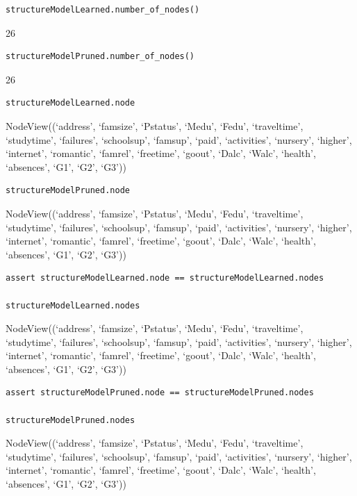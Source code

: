 \documentclass[
]{article}
\begin{document}
\begin{verbatim}
structureModelLearned.number_of_nodes()
\end{verbatim}

26

\begin{verbatim}
structureModelPruned.number_of_nodes()
\end{verbatim}

26

\begin{verbatim}
structureModelLearned.node
\end{verbatim}

NodeView((`address', `famsize', `Pstatus', `Medu', `Fedu', `traveltime',
`studytime', `failures', `schoolsup', `famsup', `paid', `activities',
`nursery', `higher', `internet', `romantic', `famrel', `freetime',
`goout', `Dalc', `Walc', `health', `absences', `G1', `G2', `G3'))

\begin{verbatim}
structureModelPruned.node
\end{verbatim}

NodeView((`address', `famsize', `Pstatus', `Medu', `Fedu', `traveltime',
`studytime', `failures', `schoolsup', `famsup', `paid', `activities',
`nursery', `higher', `internet', `romantic', `famrel', `freetime',
`goout', `Dalc', `Walc', `health', `absences', `G1', `G2', `G3'))

\begin{verbatim}
assert structureModelLearned.node == structureModelLearned.nodes

structureModelLearned.nodes
\end{verbatim}

NodeView((`address', `famsize', `Pstatus', `Medu', `Fedu', `traveltime',
`studytime', `failures', `schoolsup', `famsup', `paid', `activities',
`nursery', `higher', `internet', `romantic', `famrel', `freetime',
`goout', `Dalc', `Walc', `health', `absences', `G1', `G2', `G3'))

\begin{verbatim}
assert structureModelPruned.node == structureModelPruned.nodes

structureModelPruned.nodes
\end{verbatim}

NodeView((`address', `famsize', `Pstatus', `Medu', `Fedu', `traveltime',
`studytime', `failures', `schoolsup', `famsup', `paid', `activities',
`nursery', `higher', `internet', `romantic', `famrel', `freetime',
`goout', `Dalc', `Walc', `health', `absences', `G1', `G2', `G3'))
\end{document}

